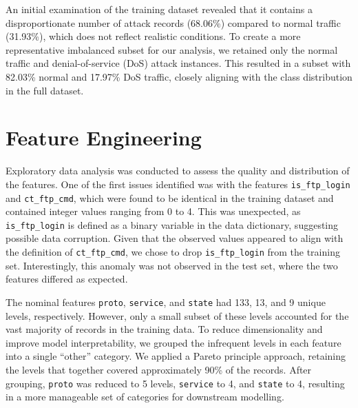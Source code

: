 \documentclass[
  a4paper,
]{scrreprt}
\begin{document}
An initial examination of the training dataset revealed that it contains
a disproportionate number of attack records (68.06\%) compared to normal
traffic (31.93\%), which does not reflect realistic conditions. To
create a more representative imbalanced subset for our analysis, we
retained only the normal traffic and denial-of-service (DoS) attack
instances. This resulted in a subset with 82.03\% normal and 17.97\% DoS
traffic, closely aligning with the class distribution in the full
dataset.

\section{Feature Engineering}\label{feature-engineering}

Exploratory data analysis was conducted to assess the quality and
distribution of the features. One of the first issues identified was
with the features \texttt{is\_ftp\_login} and \texttt{ct\_ftp\_cmd},
which were found to be identical in the training dataset and contained
integer values ranging from 0 to 4. This was unexpected, as
\texttt{is\_ftp\_login} is defined as a binary variable in the data
dictionary, suggesting possible data corruption. Given that the observed
values appeared to align with the definition of \texttt{ct\_ftp\_cmd},
we chose to drop \texttt{is\_ftp\_login} from the training set.
Interestingly, this anomaly was not observed in the test set, where the
two features differed as expected.

The nominal features \texttt{proto}, \texttt{service}, and
\texttt{state} had 133, 13, and 9 unique levels, respectively. However,
only a small subset of these levels accounted for the vast majority of
records in the training data. To reduce dimensionality and improve model
interpretability, we grouped the infrequent levels in each feature into
a single ``other'' category. We applied a Pareto principle approach,
retaining the levels that together covered approximately 90\% of the
records. After grouping, \texttt{proto} was reduced to 5 levels,
\texttt{service} to 4, and \texttt{state} to 4, resulting in a more
manageable set of categories for downstream modelling.
\end{document}
